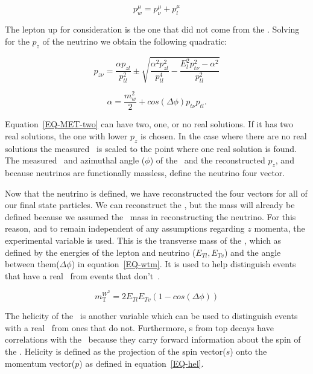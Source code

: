\begin{equation}
\label{EQ-MET-one}
p_{w}^{\mu}=p_{\nu}^{\mu}+p_{l}^{\mu}
\end{equation}

The lepton up for consideration is the one that did not come from the \az. Solving for the $p_z$ of the neutrino we obtain the following quadratic:

\begin{equation}
\label{EQ-MET-two}
p_{z\nu}=\frac{\alpha  p_{zl}}{p_{tl}^{2}} \pm \sqrt{\frac{\alpha^2 p_{zl}^2}{p_{tl}^4} - \frac{E_l^2 p_{t\nu}^2-\alpha^2}{p_{tl}^2}}
\end{equation}

\begin{equation}
\label{EQ-MET-three}
\alpha = \frac{m_w^2}{2}+cos(\Delta \phi) p_{t\nu} p_{tl}.
\end{equation}

Equation~\ref{EQ-MET-two} can have two, one, or no real solutions. If it has two real solutions, the one with lower $p_z$ is chosen. In the case where there are no real solutions the measured \met~is scaled to the point where one real solution is found. The measured \met~and azimuthal angle ($\phi$) of the \met~and the reconstructed $p_z$, and because neutrinos are functionally massless, define the neutrino four vector. 

Now that the neutrino is defined, we have reconstructed the four vectors for all of our final state particles. We can reconstruct the \aw, but the mass will already be defined because we assumed the \awhyph~mass in reconstructing the neutrino. For this reason, and to remain independent of any assumptions regarding $z$ momenta, the experimental variable \wtm is used. This is the transverse mass of the \aw, which as defined by the energies of the lepton and neutrino ($E_{Tl}, E_{Tv}$) and the angle between them($\Delta \phi$) in equation~\ref{EQ-wtm}. It is used to help distinguish events that have a real \aw~from events that don't~\cite{MET,TOPMET}. 

\begin{equation}
\label{EQ-wtm}
m_{\textrm{T}}^{W^{2}} = 2 E_{Tl} E_{Tv} (1-cos(\Delta \phi))
\end{equation}

The helicity of the \aw~is another variable which can be used to distinguish events with a real \aw~from ones that do not. Furthermore, \aw s from top decays have correlations with the \bjet~because they carry forward information about the spin of the \at. Helicity is defined as the projection of the spin vector($s$) onto the momentum vector($p$) as defined in equation~\ref{EQ-hel}.


